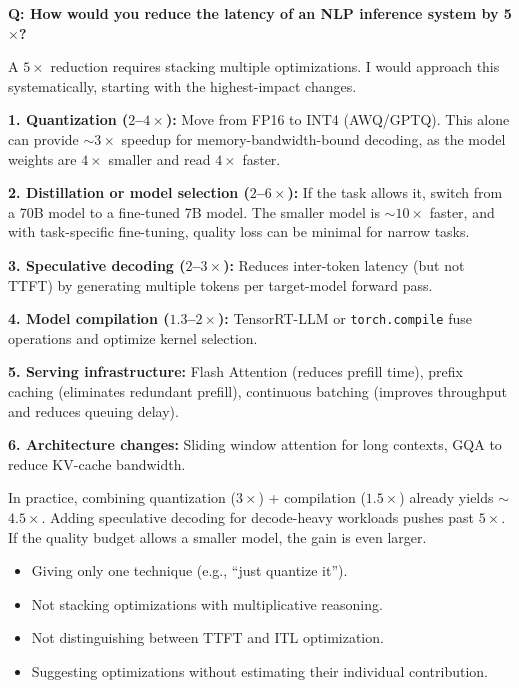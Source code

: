 \begin{interviewq}
\textbf{Q: How would you reduce the latency of an NLP inference system by 5$\times$?}

 \quad {} \quad \badgefreq{\freqhigh}

\stronganswer
A $5\times$ reduction requires stacking multiple optimizations.  I would approach this
systematically, starting with the highest-impact changes.

\textbf{1. Quantization ($2$--$4\times$):}  Move from FP16 to INT4 (AWQ/GPTQ).  This
alone can provide $\sim$$3\times$ speedup for memory-bandwidth-bound decoding, as the
model weights are $4\times$ smaller and read $4\times$ faster.

\textbf{2. Distillation or model selection ($2$--$6\times$):}  If the task allows it,
switch from a 70B model to a fine-tuned 7B model.  The smaller model is $\sim$$10\times$
faster, and with task-specific fine-tuning, quality loss can be minimal for narrow tasks.

\textbf{3. Speculative decoding ($2$--$3\times$):}  Reduces inter-token latency (but not
TTFT) by generating multiple tokens per target-model forward pass.

\textbf{4. Model compilation ($1.3$--$2\times$):}  TensorRT-LLM or \texttt{torch.compile}
fuse operations and optimize kernel selection.

\textbf{5. Serving infrastructure:}  Flash Attention (reduces prefill time), prefix
caching (eliminates redundant prefill), continuous batching (improves throughput and
reduces queuing delay).

\textbf{6. Architecture changes:}  Sliding window attention for long contexts, GQA to
reduce KV-cache bandwidth.

In practice, combining quantization ($3\times$) + compilation ($1.5\times$) already
yields $\sim$$4.5\times$.  Adding speculative decoding for decode-heavy workloads pushes
past $5\times$.  If the quality budget allows a smaller model, the gain is even larger.

\redflags
\begin{itemize}
    \item Giving only one technique (e.g., ``just quantize it'').
    \item Not stacking optimizations with multiplicative reasoning.
    \item Not distinguishing between TTFT and ITL optimization.
    \item Suggesting optimizations without estimating their individual contribution.
\end{itemize}


\end{interviewq}
